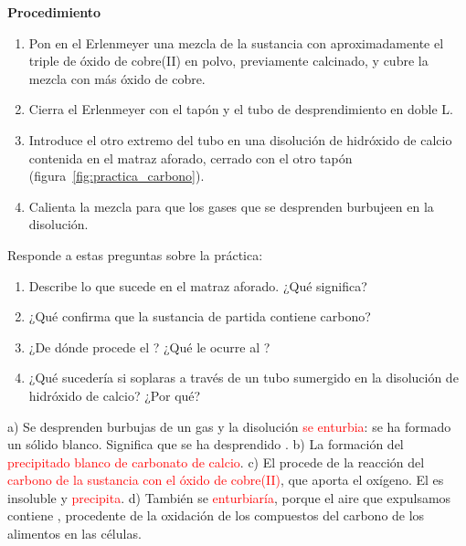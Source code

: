 \medskip

\textbf{Procedimiento}
\begin{enumerate}[label=\numberballgreen]
    \item Pon en el Erlenmeyer una mezcla de la sustancia con aproximadamente el triple de óxido de cobre(II) en polvo, previamente calcinado, y cubre la mezcla con más óxido de cobre.
    \item Cierra el Erlenmeyer con el tapón y el tubo de desprendimiento en doble L.
    \item Introduce el otro extremo del tubo en una disolución de hidróxido de calcio contenida en el matraz aforado, cerrado con el otro tapón (figura~\ref{fig:practica_carbono}).
    \item Calienta la mezcla para que los gases que se desprenden burbujeen en la disolución.
\end{enumerate}

\begin{exercise}
    Responde a estas preguntas sobre la práctica:
    \begin{enumerate}[label=\alph*)]
        \item Describe lo que sucede en el matraz aforado. ¿Qué significa?
        \item ¿Qué confirma que la sustancia de partida contiene carbono?
        \item ¿De dónde procede el ? ¿Qué le ocurre al ?
        \item ¿Qué sucedería si soplaras a través de un tubo sumergido en la disolución de hidróxido de calcio? ¿Por qué?
    \end{enumerate}
    \begin{solu}
        a) Se desprenden burbujas de un gas y la disolución \textcolor{red}{se enturbia}: se ha formado un sólido blanco. Significa que se ha desprendido .
        b) La formación del \textcolor{red}{precipitado blanco de carbonato de calcio}.
        c) El  procede de la reacción del \textcolor{red}{carbono de la sustancia con el óxido de cobre(II)}, que aporta el oxígeno. El  es insoluble y \textcolor{red}{precipita}.
        d) También se \textcolor{red}{enturbiaría}, porque el aire que expulsamos contiene , procedente de la oxidación de los compuestos del carbono de los alimentos en las células.
    \end{solu}
\end{exercise}

